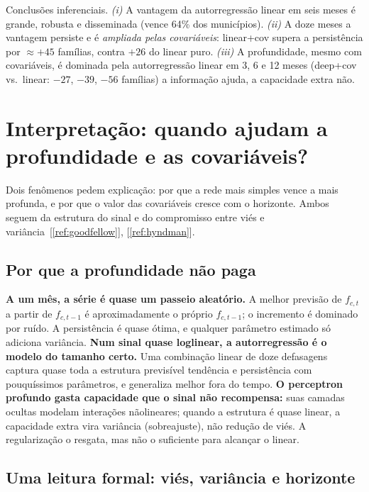 \documentclass[12pt,a4paper,oneside]{article}
\newcommand{\C}[1]{[\ref{#1}]}
\begin{document}
Conclusões inferenciais. \emph{(i)} A vantagem da autorregressão linear em
seis meses é grande, robusta e disseminada (vence 64\% dos municípios).
\emph{(ii)} A doze meses a vantagem persiste e é \emph{ampliada pelas
covariáveis}: linear+cov supera a persistência por $\approx{+}45$ famílias,
contra $+26$ do linear puro. \emph{(iii)} A profundidade, mesmo com
covariáveis, é dominada pela autorregressão linear em 3, 6 e 12 meses
(deep+cov vs.\ linear: $-27$, $-39$, $-56$ famílias) \textemdash{} a
informação ajuda, a capacidade extra não.

\section{Interpretação: quando ajudam a profundidade e as covariáveis?}
\label{sec:interpretacao}

Dois fenômenos pedem explicação: por que a rede mais simples vence a mais
profunda, e por que o valor das covariáveis cresce com o horizonte. Ambos
seguem da estrutura do sinal e do compromisso entre viés e
variância~\C{ref:goodfellow}, \C{ref:hyndman}.

\subsection{Por que a profundidade não paga}

\textbf{A um mês, a série é quase um passeio aleatório.} A melhor previsão
de $f_{c,t}$ a partir de $f_{c,t-1}$ é aproximadamente o próprio
$f_{c,t-1}$; o incremento é dominado por ruído. A persistência é quase
ótima, e qualquer parâmetro estimado só adiciona variância.
\textbf{Num sinal quase log\-linear, a autorregressão é o modelo do
tamanho certo.} Uma combinação linear de doze defasagens captura quase
toda a estrutura previsível \textemdash{} tendência e persistência
\textemdash{} com pouquíssimos parâmetros, e generaliza melhor fora do
tempo. \textbf{O perceptron profundo gasta capacidade que o sinal não
recompensa:} suas camadas ocultas modelam interações não\-lineares; quando
a estrutura é quase linear, a capacidade extra vira variância
(sobreajuste), não redução de viés. A regularização o resgata, mas não o
suficiente para alcançar o linear.

\subsection{Uma leitura formal: viés, variância e horizonte}
\end{document}
